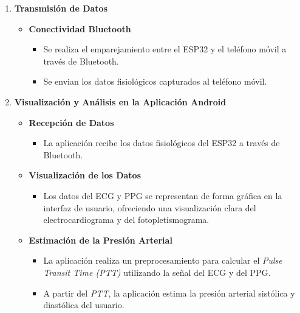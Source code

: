 \begin{enumerate}
\begin{itemize}
\begin{itemize}
                    \end{itemize}
            \end{itemize}
        \item \textbf{Transmisión de Datos}
            \begin{itemize}
                \item \textbf{Conectividad Bluetooth}
                    \begin{itemize}
                        \item Se realiza el emparejamiento entre el ESP32 y el teléfono móvil a través de Bluetooth.
                        \item Se envian los datos fisiológicos capturados al teléfono móvil.
                    \end{itemize}
            \end{itemize}
        \item \textbf{Visualización y Análisis en la Aplicación Android}
            \begin{itemize}
                \item \textbf{Recepción de Datos}
                    \begin{itemize}
                        \item La aplicación recibe los datos fisiológicos del ESP32 a través de Bluetooth.
                    \end{itemize}
                \item \textbf{Visualización de los Datos}
                    \begin{itemize}
                        \item Los datos del ECG y PPG se representan de forma gráfica en la interfaz de usuario, ofreciendo una visualización clara del electrocardiograma y del fotopletismograma.
                    \end{itemize}
                \item \textbf{Estimación de la Presión Arterial}
                    \begin{itemize}
                        \item La aplicación realiza un preprocesamiento para calcular el \textit{Pulse Transit Time (PTT)} utilizando la señal del ECG y del PPG.
                        \item A partir del \textit{PTT}, la aplicación estima la presión arterial sistólica y diastólica del usuario.
                    \end{itemize}
            \end{itemize}
    \end{enumerate}

